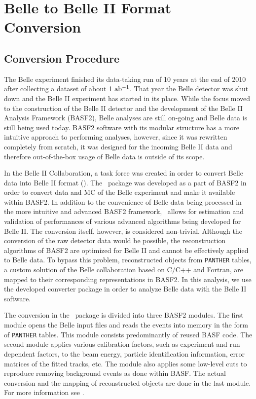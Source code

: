 \chapter{Belle to Belle II Format Conversion}

\section{Conversion Procedure}
The Belle experiment finished its data-taking run of 10 years at the end of 2010 after collecting a dataset of about $1\mathrm{~ab^{-1}}$. That year the Belle detector was shut down and the Belle II experiment has started in its place. While the focus moved to the construction of the Belle II detector and the development of the Belle II Analysis Framework (BASF2), Belle analyses are still on-going and Belle data is still being used today. BASF2 software with its modular structure has a more intuitive approach to performing analyses, however, since it was rewritten completely from scratch, it was designed for the incoming Belle II data and therefore out-of-the-box usage of Belle data is outside of its scope.

In the Belle II Collaboration, a task force was created in order to convert Belle data into Belle II format (\btbii). The \btbii~package was developed as a part of BASF2 in order to convert data and MC of the Belle experiment and make it available within BASF2. In addition to the convenience of Belle data being processed in the more intuitive and advanced BASF2 framework, \btbii~allows for estimation and validation of performances of various advanced algorithms being developed for Belle II. The conversion itself, however, is considered non-trivial. Although the conversion of the raw detector data would be possible, the reconstruction algorithms of BASF2 are optimized for Belle II and cannot be effectively applied to Belle data. To bypass this problem, reconstructed objects from \texttt{PANTHER} tables, a custom solution of the Belle collaboration based on C/C++ and Fortran, are mapped to their corresponding representations in BASF2. In this analysis, we use the developed converter package in order to analyze Belle data with the Belle II software.

The conversion in the \btbii~package is divided into three BASF2 modules. The first module opens the Belle input files and reads the events into memory in the form of \texttt{PANTHER} tables. This module consists predominantly of reused BASF code. The second module applies various calibration factors, such as experiment and run dependent factors, to the beam energy, particle identification information, error matrices of the fitted tracks, etc. The module also applies some low-level cuts to reproduce removing background events as done within BASF. The actual conversion and the mapping of reconstructed objects are done in the last module. For more information see \cite{Keck:48940}.


